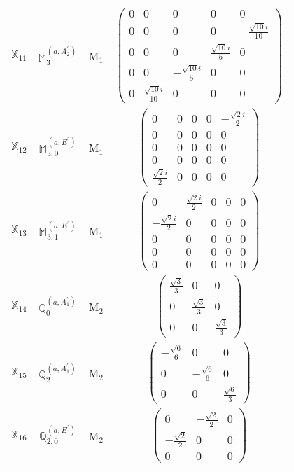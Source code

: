 \documentclass[fleqn,10pt,landscape]{article}
\begin{document}
\begin{itemize}
\begin{center}
\begin{longtable}{c|c|c|c}
$ \mathbb{X}_{11} $ & $\mathbb{M}_{3}^{(a,A_{2}^{\prime})}$ & M$_{1}$ & $\begin{pmatrix} 0 & 0 & 0 & 0 & 0 \\ 0 & 0 & 0 & 0 & - \frac{\sqrt{10} i}{10} \\ 0 & 0 & 0 & \frac{\sqrt{10} i}{5} & 0 \\ 0 & 0 & - \frac{\sqrt{10} i}{5} & 0 & 0 \\ 0 & \frac{\sqrt{10} i}{10} & 0 & 0 & 0 \end{pmatrix}$ \\
$ \mathbb{X}_{12} $ & $\mathbb{M}_{3,0}^{(a,E^{\prime})}$ & M$_{1}$ & $\begin{pmatrix} 0 & 0 & 0 & 0 & - \frac{\sqrt{2} i}{2} \\ 0 & 0 & 0 & 0 & 0 \\ 0 & 0 & 0 & 0 & 0 \\ 0 & 0 & 0 & 0 & 0 \\ \frac{\sqrt{2} i}{2} & 0 & 0 & 0 & 0 \end{pmatrix}$ \\
$ \mathbb{X}_{13} $ & $\mathbb{M}_{3,1}^{(a,E^{\prime})}$ & M$_{1}$ & $\begin{pmatrix} 0 & \frac{\sqrt{2} i}{2} & 0 & 0 & 0 \\ - \frac{\sqrt{2} i}{2} & 0 & 0 & 0 & 0 \\ 0 & 0 & 0 & 0 & 0 \\ 0 & 0 & 0 & 0 & 0 \\ 0 & 0 & 0 & 0 & 0 \end{pmatrix}$ \\ \hline
$ \mathbb{X}_{14} $ & $\mathbb{Q}_{0}^{(a,A_{1}^{\prime})}$ & M$_{2}$ & $\begin{pmatrix} \frac{\sqrt{3}}{3} & 0 & 0 \\ 0 & \frac{\sqrt{3}}{3} & 0 \\ 0 & 0 & \frac{\sqrt{3}}{3} \end{pmatrix}$ \\
$ \mathbb{X}_{15} $ & $\mathbb{Q}_{2}^{(a,A_{1}^{\prime})}$ & M$_{2}$ & $\begin{pmatrix} - \frac{\sqrt{6}}{6} & 0 & 0 \\ 0 & - \frac{\sqrt{6}}{6} & 0 \\ 0 & 0 & \frac{\sqrt{6}}{3} \end{pmatrix}$ \\
$ \mathbb{X}_{16} $ & $\mathbb{Q}_{2,0}^{(a,E^{\prime})}$ & M$_{2}$ & $\begin{pmatrix} 0 & - \frac{\sqrt{2}}{2} & 0 \\ - \frac{\sqrt{2}}{2} & 0 & 0 \\ 0 & 0 & 0 \end{pmatrix}$ \\

\end{longtable}
\end{center}
\end{itemize}
\end{document}
